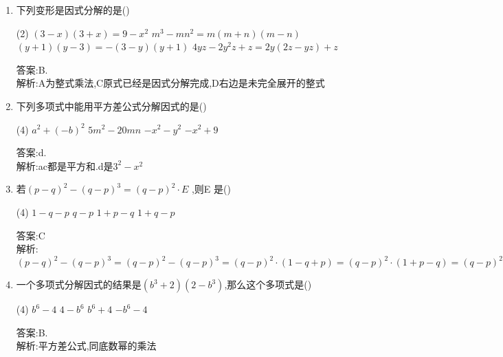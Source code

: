 \documentclass[cn,blue]{elegantbook}
\begin{document}
\begin{enumerate}
    \item 下列变形是因式分解的是(\qquad)\\
        \begin{tasks}(2) 
            \task \((3 - x)(3 + x) = 9 - x^2\)
            \task \(m^3 - mn^2 = m(m + n)(m - n)\)
            \task \(( y +1)( y - 3) = -(3 - y)( y +1)\)
            \task \(4yz - 2y^2 z + z = 2y(2z - yz) + z\)
        \end{tasks}
\begin{solution}
    答案:B.\\
    解析:A为整式乘法,C原式已经是因式分解完成,D右边是未完全展开的整式\\
\end{solution}
    \item 下列多项式中能用平方差公式分解因式的是(\qquad)\\
    \begin{tasks}(4) 
    \task \(a^2 + (-b)^2\)
    \task \(5m^2 - 20mn\)
    \task \(-x^2 - y^2\)
    \task \(-x^2 + 9\)
    \end{tasks}
\begin{solution}
    答案:d.\\
    解析:ac都是平方和.d是\(3^2-x^2\)\\
\end{solution}
    \item 若\(( p - q)^2 - (q - p)^3 = (q - p)^2 \cdot  E\) ,则E 是(\qquad)\\
    \begin{tasks}(4) 
    \task \(1- q - p\)
    \task \(q - p\)
    \task \(1+ p - q\)
    \task \(1+ q - p\)
    \end{tasks}
\begin{solution}
    答案:C\\
    解析:\(( p - q)^2 - (q - p)^3 =(q-p)^2-(q-p)^3=(q-p)^2\cdot (1-q+p)=(q-p)^2\cdot (1+p-q)= (q - p)^2 \cdot  E,\therefore E=1+p-q\)\\
\end{solution}
              
    \item 一个多项式分解因式的结果是\((b^3 + 2)(2 - b^3 )\),那么这个多项式是(\qquad)\\
    \begin{tasks}(4) 
    \task \(b^6 - 4\)
    \task \(4 - b^6\)
    \task \(b^6 + 4\)
    \task \(-b^6 - 4\)
    \end{tasks}
\begin{solution}
    答案:B.\\
    解析:平方差公式,同底数幂的乘法\\
\end{solution}
              

\end{enumerate}
\end{document}
